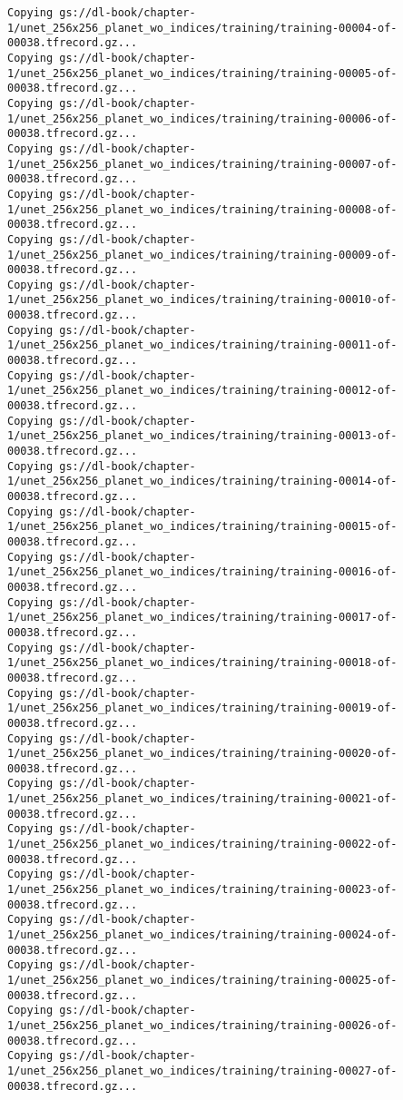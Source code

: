 \documentclass[
  letterpaper,
  DIV=11,
  numbers=noendperiod]{scrreprt}
\begin{document}
\begin{verbatim}
Copying gs://dl-book/chapter-1/unet_256x256_planet_wo_indices/training/training-00004-of-00038.tfrecord.gz...
Copying gs://dl-book/chapter-1/unet_256x256_planet_wo_indices/training/training-00005-of-00038.tfrecord.gz...
Copying gs://dl-book/chapter-1/unet_256x256_planet_wo_indices/training/training-00006-of-00038.tfrecord.gz...
Copying gs://dl-book/chapter-1/unet_256x256_planet_wo_indices/training/training-00007-of-00038.tfrecord.gz...
Copying gs://dl-book/chapter-1/unet_256x256_planet_wo_indices/training/training-00008-of-00038.tfrecord.gz...
Copying gs://dl-book/chapter-1/unet_256x256_planet_wo_indices/training/training-00009-of-00038.tfrecord.gz...
Copying gs://dl-book/chapter-1/unet_256x256_planet_wo_indices/training/training-00010-of-00038.tfrecord.gz...
Copying gs://dl-book/chapter-1/unet_256x256_planet_wo_indices/training/training-00011-of-00038.tfrecord.gz...
Copying gs://dl-book/chapter-1/unet_256x256_planet_wo_indices/training/training-00012-of-00038.tfrecord.gz...
Copying gs://dl-book/chapter-1/unet_256x256_planet_wo_indices/training/training-00013-of-00038.tfrecord.gz...
Copying gs://dl-book/chapter-1/unet_256x256_planet_wo_indices/training/training-00014-of-00038.tfrecord.gz...
Copying gs://dl-book/chapter-1/unet_256x256_planet_wo_indices/training/training-00015-of-00038.tfrecord.gz...
Copying gs://dl-book/chapter-1/unet_256x256_planet_wo_indices/training/training-00016-of-00038.tfrecord.gz...
Copying gs://dl-book/chapter-1/unet_256x256_planet_wo_indices/training/training-00017-of-00038.tfrecord.gz...
Copying gs://dl-book/chapter-1/unet_256x256_planet_wo_indices/training/training-00018-of-00038.tfrecord.gz...
Copying gs://dl-book/chapter-1/unet_256x256_planet_wo_indices/training/training-00019-of-00038.tfrecord.gz...
Copying gs://dl-book/chapter-1/unet_256x256_planet_wo_indices/training/training-00020-of-00038.tfrecord.gz...
Copying gs://dl-book/chapter-1/unet_256x256_planet_wo_indices/training/training-00021-of-00038.tfrecord.gz...
Copying gs://dl-book/chapter-1/unet_256x256_planet_wo_indices/training/training-00022-of-00038.tfrecord.gz...
Copying gs://dl-book/chapter-1/unet_256x256_planet_wo_indices/training/training-00023-of-00038.tfrecord.gz...
Copying gs://dl-book/chapter-1/unet_256x256_planet_wo_indices/training/training-00024-of-00038.tfrecord.gz...
Copying gs://dl-book/chapter-1/unet_256x256_planet_wo_indices/training/training-00025-of-00038.tfrecord.gz...
Copying gs://dl-book/chapter-1/unet_256x256_planet_wo_indices/training/training-00026-of-00038.tfrecord.gz...
Copying gs://dl-book/chapter-1/unet_256x256_planet_wo_indices/training/training-00027-of-00038.tfrecord.gz...

\end{verbatim}
\end{document}
